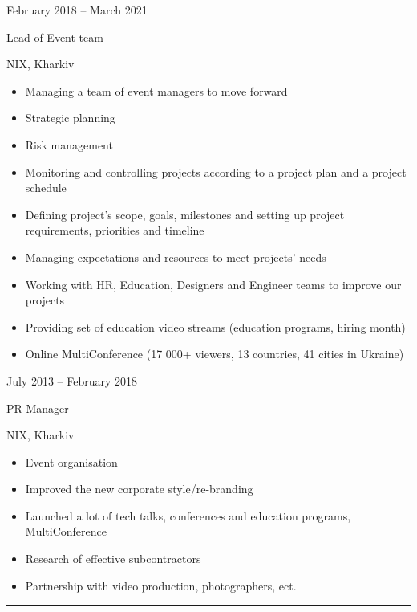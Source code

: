 \documentclass[a4paper,10pt]{article}
\newlength{\cvcolumngapwidth}
\newlength{\cvleftcolumnwidth}
\newlength{\cvrightcolumnwidth}
\newcommand{\cvsectionstyle}[1]{{\normalsize\cvsectionfont\textcolor{cvsectioncolor}{#1}}}
\newcommand{\cvtitlestyle}[1]{{\large\cvtitlefont\textcolor{cvtitlecolor}{#1}}}
\newcommand{\cvdurationstyle}[1]{{\small\cvdurationfont\textcolor{cvdurationcolor}{#1}}}
\newlength{\cvafteritemskipamount}
\newlength{\cvaftersectionskipamount}
\newlength{\cvaftertitleskipamount}
\newlength{\cvparskip}
\newcommand{\cvsection}[1]{
\begin{minipage}[t]{\cvleftcolumnwidth}
    \raggedleft\cvsectionstyle{#1}
\end{minipage}%
\hspace{\cvcolumngapwidth}%
\begin{minipage}[t]{\cvrightcolumnwidth}
    \textcolor{cvrulecolor}{\rule{\cvrightcolumnwidth}{0.3mm}}
\end{minipage}

\vspace{\cvaftersectionskipamount}
}
\newcommand{\cvitem}[2]{
\begin{minipage}[t]{\cvleftcolumnwidth}
    \raggedleft #1
\end{minipage}%
\hspace{\cvcolumngapwidth}%
\begin{minipage}[t]{\cvrightcolumnwidth}
    \setlength{\parskip}{\cvparskip} #2
\end{minipage}

\vspace{\cvafteritemskipamount}
}
\newcommand{\cvtitle}[1]{
\cvtitlestyle{#1}

\vspace{\cvaftertitleskipamount}
\vspace{-\cvparskip}
}
\begin{document}
\cvitem{
\cvdurationstyle{February 2018 -- March 2021}
}{
\cvtitle{Lead of Event team}

NIX, Kharkiv

\begin{itemize}[leftmargin=*]
    \item Managing a team of event managers to move forward
    \item Strategic planning
    \item Risk management
    \item Monitoring and controlling projects according to a project plan and a project
    schedule
    
    \item Defining project’s scope, goals, milestones and setting up project requirements, priorities and timeline
    \item Managing expectations and resources to meet projects’ needs
    
    \item Working with HR, Education, Designers and  Engineer teams  to improve our projects 
    \item Providing set of education video streams (education programs, hiring month) 
    \item Online MultiConference (17 000+ viewers, 13 countries, 41 cities in Ukraine)
    
    
    
\end{itemize}
}

\cvitem{
\cvdurationstyle{July 2013 -- February 2018}
}{
\cvtitle{PR Manager}

NIX, Kharkiv

\begin{itemize}[leftmargin=*]
    \item Event organisation  
    \item Improved the new corporate style/re-branding
    \item Launched a lot of tech talks, conferences and education programs, MultiConference  
    \item Research of effective subcontractors 
    \item Partnership with video production, photographers, ect. 
    
\end{itemize}
}



\cvsection{EDUCATION}
\end{document}
